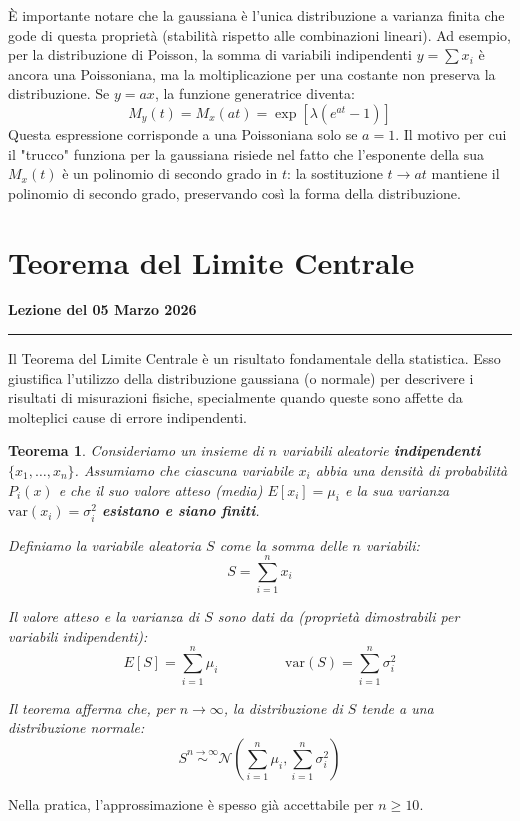 \documentclass[openany,a4paper,12pt]{book}
\newtheorem*{theorem*}{Teorema}
\theoremstyle{remark}
\newcommand{\thelezione}{}
\newcommand{\lezione}[2]{
\newpage
\renewcommand{\thelezione}{#2} 
\section{#1} 
\noindent\textbf{\color{RoyalBlue}Lezione del #2}\par\vspace{0.5em}\hrule\vspace{1em}
}
\begin{document}
È importante notare che la gaussiana è l'unica distribuzione a varianza finita che gode di questa proprietà (stabilità rispetto alle combinazioni lineari).
Ad esempio, per la distribuzione di Poisson, la somma di variabili indipendenti $y = \sum x_i$ è ancora una Poissoniana, ma la moltiplicazione per una costante non preserva la distribuzione. Se $y=ax$, la funzione generatrice diventa:
\begin{equation}
M_y(t) = M_x(at) = \exp [\lambda (e^{at} - 1)]
\end{equation}
Questa espressione corrisponde a una Poissoniana solo se $a=1$.
Il motivo per cui il "trucco" funziona per la gaussiana risiede nel fatto che l'esponente della sua $M_x(t)$ è un polinomio di secondo grado in $t$: la sostituzione $t \to at$ mantiene il polinomio di secondo grado, preservando così la forma della distribuzione.


\lezione{Teorema del Limite Centrale}{05 Marzo 2026}

Il Teorema del Limite Centrale è un risultato fondamentale della statistica. Esso giustifica l'utilizzo della distribuzione gaussiana (o normale) per descrivere i risultati di misurazioni fisiche, specialmente quando queste sono affette da molteplici cause di errore indipendenti.

\begin{theorem*}
    Consideriamo un insieme di $n$ variabili aleatorie \textbf{indipendenti} $\{x_1, \dots, x_n\}$.
    Assumiamo che ciascuna variabile $x_i$ abbia una densità di probabilità $P_i(x)$ e che il suo valore atteso (media) $E[x_i]=\mu_i$ e la sua varianza $\text{var}(x_i)=\sigma_i^2$ \textbf{esistano e siano finiti}.

    Definiamo la variabile aleatoria $S$ come la somma delle $n$ variabili:
    \[
    S = \sum_{i=1}^{n} x_i
    \]
    
    Il valore atteso e la varianza di $S$ sono dati da (proprietà dimostrabili per variabili indipendenti):
    \[
    E[S] = \sum_{i=1}^{n} \mu_i \hspace{2cm} \text{var}(S) = \sum_{i=1}^{n} \sigma_i^2
    \]
    
    Il teorema afferma che, per $n \to \infty$, la distribuzione di $S$ tende a una distribuzione normale:
    \[
    S \overset{n \to \infty}{\sim} \mathcal{N} \left(\sum_{i=1}^{n} \mu_i, \sum_{i=1}^{n} \sigma_i^2 \right)
    \]
\end{theorem*}

Nella pratica, l'approssimazione è spesso già accettabile per $n \ge 10$.
\end{document}
